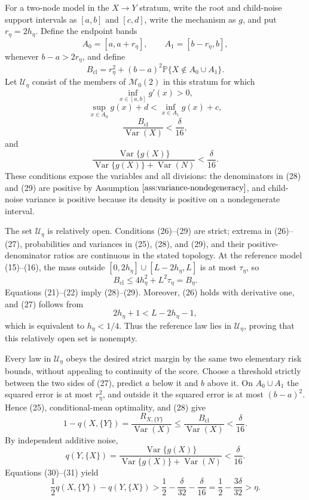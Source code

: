 For a two-node model in the \(X\to Y\) stratum, write the root and child-noise support intervals as \([a,b]\) and \([c,d]\), write the mechanism as \(g\), and put \(r_\eta=2h_\eta\).  Define the endpoint bands
\[
 A_0=[a,a+r_\eta],\qquad A_1=[b-r_\eta,b],
\]
whenever \(b-a>2r_\eta\), and define
\[
 B_{\mathrm{cl}}=r_\eta^2+(b-a)^2
 \mathbb P\{X\notin A_0\cup A_1\}. \tag{25}
\]
Let \(\mathcal U_\eta\) consist of the members of \(\mathcal M_0(2)\) in this stratum for which
\[
 \inf_{x\in[a,b]}g'(x)>0, \tag{26}
\]
\[
 \sup_{x\in A_0}g(x)+d
 <\inf_{x\in A_1}g(x)+c, \tag{27}
\]
\[
 \frac{B_{\mathrm{cl}}}{\operatorname{Var}(X)}<\frac{\delta}{16}, \tag{28}
\]
and
\[
 \frac{\operatorname{Var}\{g(X)\}}
 {\operatorname{Var}\{g(X)\}+\operatorname{Var}(N)}
 <\frac{\delta}{16}. \tag{29}
\]
These conditions expose the variables and all divisions: the denominators in (28) and (29) are positive by Assumption \(\ref{ass:variance-nondegeneracy}\), and child-noise variance is positive because its density is positive on a nondegenerate interval.

The set \(\mathcal U_\eta\) is relatively open.  Conditions (26)--(29) are strict; extrema in (26)--(27), probabilities and variances in (25), (28), and (29), and their positive-denominator ratios are continuous in the stated topology.  At the reference model (15)--(16), the mass outside \([0,2h_\eta]\cup[L-2h_\eta,L]\) is at most \(\tau_\eta\), so
\[
 B_{\mathrm{cl}}\le4h_\eta^2+L^2\tau_\eta=B_\eta.
\]
Equations (21)--(22) imply (28)--(29).  Moreover, (26) holds with derivative one, and (27) follows from
\[
 2h_\eta+1<L-2h_\eta-1,
\]
which is equivalent to \(h_\eta<1/4\).  Thus the reference law lies in \(\mathcal U_\eta\), proving that this relatively open set is nonempty.

Every law in \(\mathcal U_\eta\) obeys the desired strict margin by the same two elementary risk bounds, without appealing to continuity of the score.  Choose a threshold strictly between the two sides of (27), predict \(a\) below it and \(b\) above it.  On \(A_0\cup A_1\) the squared error is at most \(r_\eta^2\), and outside it the squared error is at most \((b-a)^2\).  Hence (25), conditional-mean optimality, and (28) give
\[
 1-q(X,\{Y\})
 =\frac{R_{X,\{Y\}}}{\operatorname{Var}(X)}
 \le\frac{B_{\mathrm{cl}}}{\operatorname{Var}(X)}
 <\frac{\delta}{16}. \tag{30}
\]
By independent additive noise,
\[
 q(Y,\{X\})
 =\frac{\operatorname{Var}\{g(X)\}}
 {\operatorname{Var}\{g(X)\}+\operatorname{Var}(N)}
 <\frac{\delta}{16}. \tag{31}
\]
Equations (30)--(31) yield
\[
 \frac12q(X,\{Y\})-q(Y,\{X\})
 >\frac12-\frac{\delta}{32}-\frac{\delta}{16}
 =\frac12-\frac{3\delta}{32}>\eta. \tag{32}
\]

